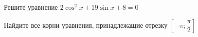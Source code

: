 \begin{ex}
	\begin{condition}
		\begin{enumcols}[label=\asbuk*)]
			\item Решите уравнение \( 2\cos^2 x + 19\sin x +8= 0 \)
			\item Найдите все корни уравнения, принадлежащие отрезку \( \left[-\pi;\dfrac{\pi}{2}\right] \)
		\end{enumcols}
	\end{condition}
\end{ex}